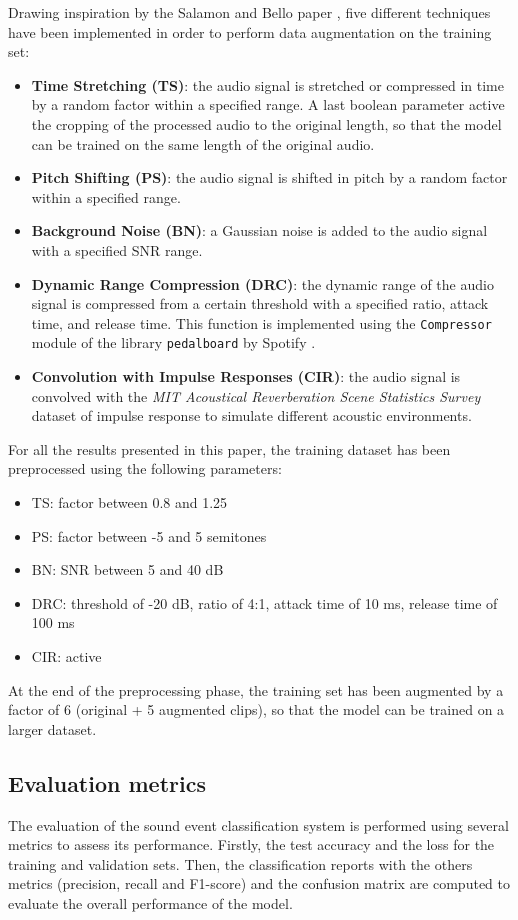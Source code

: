 \documentclass{article}
\begin{document}
\begin{sloppy}
Drawing inspiration by the Salamon and Bello paper \cite{salamon2017deep}, five different techniques have been implemented in order to perform data augmentation on the training set:
\begin{itemize}
    \item \textbf{Time Stretching (TS)}: the audio signal is stretched or compressed in time by a random factor within a specified range. A last boolean parameter active the cropping of the processed audio to the original length, so that the model can be trained on the same length of the original audio.
    \item \textbf{Pitch Shifting (PS)}: the audio signal is shifted in pitch by a random factor within a specified range.
    \item \textbf{Background Noise (BN)}: a Gaussian noise is added to the audio signal with a specified SNR range.
    \item \textbf{Dynamic Range Compression (DRC)}: the dynamic range of the audio signal is compressed from a certain threshold with a specified ratio, attack time, and release time. This function is implemented using the \texttt{Compressor} module of the library \texttt{pedalboard} by Spotify \cite{pedalboard}.
    \item \textbf{Convolution with Impulse Responses (CIR)}: the audio signal is convolved with the \textit{MIT Acoustical Reverberation Scene Statistics Survey} dataset of impulse response \cite{traer2016statistics} to simulate different acoustic environments.
\end{itemize}

For all the results presented in this paper, the training dataset has been preprocessed using the following parameters:
\begin{itemize}
    \item TS: factor between 0.8 and 1.25
    \item PS: factor between -5 and 5 semitones
    \item BN: SNR between 5 and 40 dB
    \item DRC: threshold of -20 dB, ratio of 4:1, attack time of 10 ms, release time of 100 ms
    \item CIR: active
\end{itemize}

At the end of the preprocessing phase, the training set has been augmented by a factor of 6 (original + 5 augmented clips), so that the model can be trained on a larger dataset.

\subsection{Evaluation metrics}
\label{sec:metrics}
The evaluation of the sound event classification system is performed using several metrics to assess its performance.
Firstly, the test accuracy and the loss for the training and validation sets. Then, the classification reports with
the others metrics (precision, recall and F1-score) and the confusion matrix are computed to evaluate the overall
performance of the model.


\end{sloppy}
\end{document}
